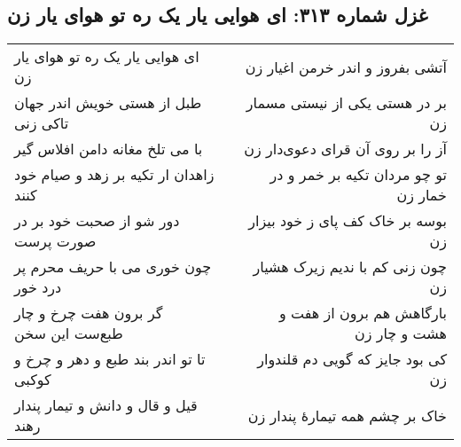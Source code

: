 \begin{center}
\section*{غزل شماره ۳۱۳: ای هوایی یار یک ره تو هوای یار زن}
\label{sec:313}
\begin{longtable}{l p{0.5cm} r}
ای هوایی یار یک ره تو هوای یار زن
&&
آتشی بفروز و اندر خرمن اغیار زن
\\
طبل از هستی خویش اندر جهان تاکی زنی
&&
بر در هستی یکی از نیستی مسمار زن
\\
با می تلخ مغانه دامن افلاس گیر
&&
آز را بر روی آن قرای دعوی‌دار زن
\\
زاهدان ار تکیه بر زهد و صیام خود کنند
&&
تو چو مردان تکیه بر خمر و در خمار زن
\\
دور شو از صحبت خود بر در صورت پرست
&&
بوسه بر خاک کف پای ز خود بیزار زن
\\
چون خوری می با حریف محرم پر درد خور
&&
چون زنی کم با ندیم زیرک هشیار زن
\\
گر برون هفت چرخ و چار طبع‌ست این سخن
&&
بارگاهش هم برون از هفت و هشت و چار زن
\\
تا تو اندر بند طبع و دهر و چرخ و کوکبی
&&
کی بود جایز که گویی دم قلندوار زن
\\
قیل و قال و دانش و تیمار پندار رهند
&&
خاک بر چشم همه تیمارهٔ پندار زن
\\
\end{longtable}
\end{center}
